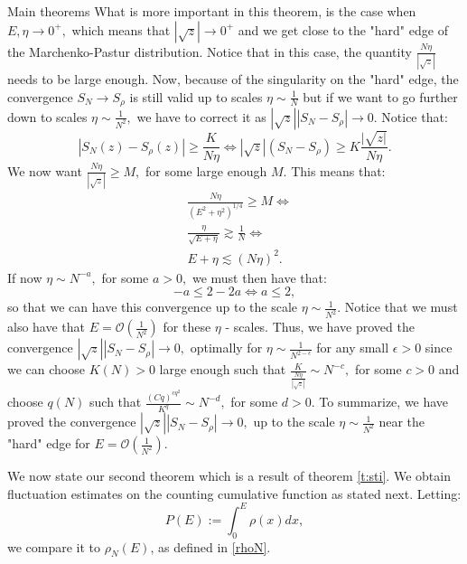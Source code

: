 \documentclass[11pt, a4paper, oneside]{book}
\numberwithin{equation}{chapter}
\begin{document}
\begin{section}{Main theorems}
What is more important in this theorem, is the case when $E,\eta \to 0^+ ,$ which means that $|\sqrt{z}| \to 0^+$ and we get close to the "hard" edge of the Marchenko-Pastur distribution. Notice that in this case, the quantity $\frac{N\eta}{|\sqrt{z}|}$ needs to be large enough. Now, because of the singularity on the "hard" edge, the convergence $S_N \to S_{\rho}$ is still valid up to scales $\eta \sim \frac{1}{N}$ but if we want to go further down to scales $\eta \sim \frac{1}{N^2},$ we have to correct it as $|\sqrt{z}| \left | S_N - S_{\rho} \right | \to 0.$ Notice that:
\[
\left | S_N(z)-S_{\rho}(z) \right | \geq  \frac{K}{N\eta} \Leftrightarrow |\sqrt{z}| \left ( S_N - S_{\rho} \right ) \geq K \frac{|\sqrt{z|}}{N\eta}.
\]
We now want $\frac{N\eta}{|\sqrt{z}|} \geq M ,$ for some large enough $M.$ This means that:
\begin{align*}
     &\frac{N\eta}{(E^2+\eta^2)^{1/4}} \geq M \Leftrightarrow \\ 
     &\frac{\eta}{\sqrt{E+\eta}} \gtrsim \frac{1}{N} \Leftrightarrow \\
     &E+\eta \lesssim (N\eta)^2.
\end{align*}
If now $\eta \sim N^{-a},$ for some $a > 0,$ we must then have that:
\[
 -a \leq 2 - 2a \Leftrightarrow a \leq 2 ,
\]
 so that we can have this convergence up to the scale $\eta \sim \frac{1}{N^2}.$ Notice that we must also have that $E = \mathcal{O} \left (\frac{1}{N^2} \right )$ for these $\eta$ - scales. Thus, we have proved the convergence $|\sqrt{z}| \left | S_N - S_{\rho} \right | \to 0,$ optimally for $\eta \sim \frac{1}{N^{2-\epsilon}}$ for any small $\epsilon > 0$ since we can choose $K(N)>0$ large enough such that $\frac{K}{\frac{N\eta}{|\sqrt{z}|}} \sim N^{-c},$ for some $c>0$ and choose $q(N)$ such that $\frac{(Cq)^{cq^2}}{K^q} \sim N^{-d},$ for some $d>0.$ To summarize, we have proved the convergence $|\sqrt{z}| \left | S_N - S_{\rho} \right | \to 0,$ up to the scale $\eta \sim \frac{1}{N^2}$ near the "hard" edge for $E = \mathcal{O} \left (\frac{1}{N^2} \right ).$

We now state our second theorem which is a result of theorem \ref{t:sti}. We obtain fluctuation estimates on the counting cumulative function as stated next. Letting:
%
\begin{equation}
P (E) := \int_0^E \rho(x)dx,
\end{equation}
we compare it to $\rho_N(E)$, as defined in \eqref{rhoN}.

\pagebreak


\end{section}
\end{document}

